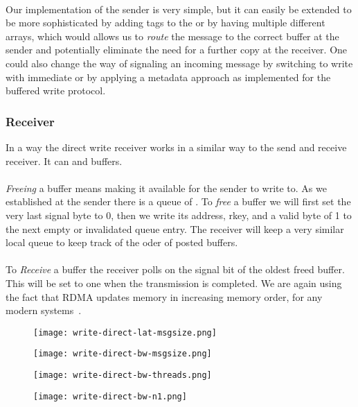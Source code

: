 \paragraph{} Our implementation of the sender is very simple, but it can easily be extended to be more sophisticated by adding
tags to the  or by having multiple different arrays, which would allows us to \emph{route} the message to the
correct buffer at the sender and potentially eliminate the need for a further copy at the receiver. One could also change
the way of signaling an incoming message by switching to write with immediate or by applying a metadata approach as implemented
for the buffered write protocol.

\subsubsection{Receiver}

In a way the direct write receiver works in a similar way to the send and receive receiver. It can  and 
 buffers. 

\paragraph{}\emph{Freeing} a buffer means making it available for the sender to write to. As we established at the sender 
there is a queue of . To \emph{free} a buffer we will first set the very last signal byte to 0, then we
write its address, rkey, and a valid byte of 1 to the next empty or invalidated queue entry. The receiver will keep a very 
similar local queue to keep track of the oder of posted buffers.

\paragraph{} To \emph{Receive} a buffer the receiver polls on the signal bit of the oldest freed buffer. This will be set
to one when the transmission is completed. We are again using the fact that RDMA updates memory in increasing memory order, 
for any modern systems~\cite{herd, farm}.


\begin{figure}[h]
\texttt{[image: write-direct-lat-msgsize.png]}
\label{fig:plot-wdir-lat}
\end{figure}


\begin{figure}[h]
\texttt{[image: write-direct-bw-msgsize.png]}
\label{fig:plot-wdir-bw}
\end{figure}



\begin{figure}[h]
\texttt{[image: write-direct-bw-threads.png]}
\label{fig:plot-wdir-bw-threads}
\end{figure}


\begin{figure}[h]
\texttt{[image: write-direct-bw-n1.png]}
\label{fig:plot-wdir-bw-n1}
\end{figure}
